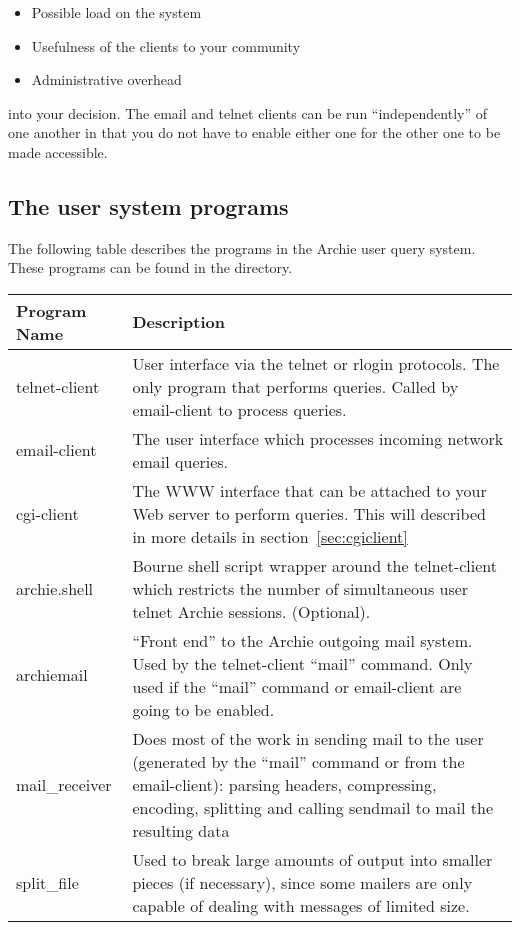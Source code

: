 \begin{itemize}
\item Possible load on the system

\item Usefulness of the clients to your community

\item Administrative overhead
\end{itemize}


into your decision. The email and telnet clients can be run ``independently''
of one another in that you do not have to enable either one for the other one
to be made accessible.

\subsection{The  user system programs}

The following table describes the programs in the Archie user query
system. These programs can be found in the  directory.

\begin{tabular}{|l|p{5in}|}\hline

Program Name & Description \\ \hline \hline

telnet-client &

User interface via the telnet or rlogin protocols. The only program that
performs queries. Called by email-client to process queries. \\ \hline

email-client &

The user interface which processes incoming network email queries. \\ \hline

cgi-client &
The WWW interface that can be attached to your Web server to perform
queries. This will described in more details in section~\ref{sec:cgiclient} \\ \hline 

archie.shell &
Bourne shell script wrapper around the telnet-client which restricts the
number of simultaneous user telnet Archie sessions. (Optional). \\ \hline

archiemail &

``Front end'' to the Archie outgoing mail system. Used by the telnet-client
``mail'' command. Only used if the ``mail'' command or email-client are going
to be enabled. \\ \hline

mail\_receiver &

Does most of the work in sending mail to the user (generated by the ``mail''
command or from the email-client): parsing headers, compressing, encoding,
splitting and calling sendmail to mail the resulting data \\ \hline

split\_file &

Used to break large amounts of output into smaller pieces (if necessary),
since some mailers are only capable of dealing with messages of limited size.
\\ \hline
\end{tabular}


